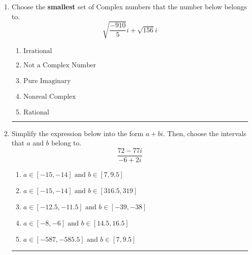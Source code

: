 \documentclass[14pt]{extbook}
\newcommand{\litem}[1]{\item#1\hspace*{-1cm}\rule{\textwidth}{0.4pt}}
\begin{document}
\begin{enumerate}
{\begin{enumerate}[label=\Alph*.]
\end{enumerate} }
\litem{
Choose the \textbf{smallest} set of Complex numbers that the number below belongs to.\[ \sqrt{\frac{-910}{5}} i+\sqrt{156}i \]\begin{enumerate}[label=\Alph*.]
\item \( \text{Irrational} \)
\item \( \text{Not a Complex Number} \)
\item \( \text{Pure Imaginary} \)
\item \( \text{Nonreal Complex} \)
\item \( \text{Rational} \)

\end{enumerate} }
\litem{
Simplify the expression below into the form $a+bi$. Then, choose the intervals that $a$ and $b$ belong to.\[ \frac{72 - 77 i}{-6 + 2 i} \]\begin{enumerate}[label=\Alph*.]
\item \( a \in [-15, -14] \text{ and } b \in [7, 9.5] \)
\item \( a \in [-15, -14] \text{ and } b \in [316.5, 319] \)
\item \( a \in [-12.5, -11.5] \text{ and } b \in [-39, -38] \)
\item \( a \in [-8, -6] \text{ and } b \in [14.5, 16.5] \)
\item \( a \in [-587, -585.5] \text{ and } b \in [7, 9.5] \)

\end{enumerate} }
\end{enumerate}
\end{document}
